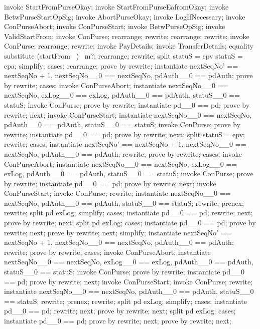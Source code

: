 \begin{LPScript}\begin{zproof}[tStartFromEafromOkayPRE]
    invoke StartFromPurseOkay;
    invoke StartFromPurseEafromOkay;
    invoke BetwPurseStartOpSig;
    invoke AbortPurseOkay;
    invoke LogIfNecessary;
    invoke \Xi ConPurseAbort;
    invoke \Xi ConPurseStart;
    invoke BetwPurseOpSig;
    invoke ValidStartFrom;
    invoke \Delta ConPurse;
    rearrange;
    rewrite;
    rearrange;
    rewrite;
    invoke ConPurse;
    rearrange;
    rewrite;
    invoke PayDetails;
    invoke TransferDetails;
    equality substitute (startFrom~ \inv)~ m?;
    rearrange;
    rewrite;
    split \lnot statuS = epv \land \lnot statuS = epa;
    simplify;
    cases;
    rearrange;
    prove by rewrite;
    instantiate nextSeqNo' == nextSeqNo + 1, nextSeqNo\_\_0 == nextSeqNo,
        pdAuth\_\_0 == pdAuth;
    prove by rewrite;
    cases;
    invoke ConPurseAbort;
    instantiate nextSeqNo\_\_0 == nextSeqNo, exLog\_\_0 == exLog,
        pdAuth\_\_0 == pdAuth, statuS\_\_0 == statuS;
    invoke ConPurse;
    prove by rewrite;
    instantiate pd\_\_0 == pd;
    prove by rewrite;
    next;
    invoke ConPurseStart;
    instantiate nextSeqNo\_\_0 == nextSeqNo, pdAuth\_\_0 == pdAuth,
        statuS\_\_0 == statuS;
    invoke ConPurse;
    prove by rewrite;
    instantiate pd\_\_0 == pd;
    prove by rewrite;
    next;
    split statuS = epv;
    rewrite;
    cases;
    instantiate nextSeqNo' == nextSeqNo + 1, nextSeqNo\_\_0 == nextSeqNo,
        pdAuth\_\_0 == pdAuth;
    rewrite;
    prove by rewrite;
    cases;
    invoke ConPurseAbort;
    instantiate nextSeqNo\_\_0 == nextSeqNo, exLog\_\_0 == exLog,
        pdAuth\_\_0 == pdAuth, statuS\_\_0 == statuS;
    invoke ConPurse;
    prove by rewrite;
    instantiate pd\_\_0 == pd;
    prove by rewrite;
    next;
    invoke ConPurseStart;
    invoke ConPurse;
    rewrite;
    instantiate
    nextSeqNo\_\_0 == nextSeqNo, pdAuth\_\_0 == pdAuth, statuS\_\_0 == statuS;
    rewrite;
    prenex;
    rewrite;
    split pd \in exLog;
    simplify;
    cases;
    instantiate pd\_\_0 == pd;
    rewrite;
    next;
    prove by rewrite;
    next;
    split pd \in exLog;
    cases;
    instantiate pd\_\_0 == pd;
    prove by rewrite;
    next;
    prove by rewrite;
    next;
    simplify;
    instantiate
    nextSeqNo' == nextSeqNo + 1, nextSeqNo\_\_0 == nextSeqNo,
    pdAuth\_\_0 == pdAuth;
    rewrite;
    prove by rewrite;
    cases;
    invoke ConPurseAbort;
    instantiate
    nextSeqNo\_\_0 == nextSeqNo, exLog\_\_0 == exLog, pdAuth\_\_0 == pdAuth,
    statuS\_\_0 == statuS;
    invoke ConPurse;
    prove by rewrite;
    instantiate pd\_\_0 == pd;
    prove by rewrite;
    next;
    invoke ConPurseStart;
    invoke ConPurse;
    rewrite;
    instantiate
    nextSeqNo\_\_0 == nextSeqNo, pdAuth\_\_0 == pdAuth, statuS\_\_0 == statuS;
    rewrite;
    prenex;
    rewrite;
    split pd \in exLog;
    simplify;
    cases;
    instantiate pd\_\_0 == pd;
    rewrite;
    next;
    prove by rewrite;
    next;
    split pd \in exLog;
    cases;
    instantiate pd\_\_0 == pd;
    prove by rewrite;
    next;
    prove by rewrite;
    next;
\end{zproof}\end{LPScript}

